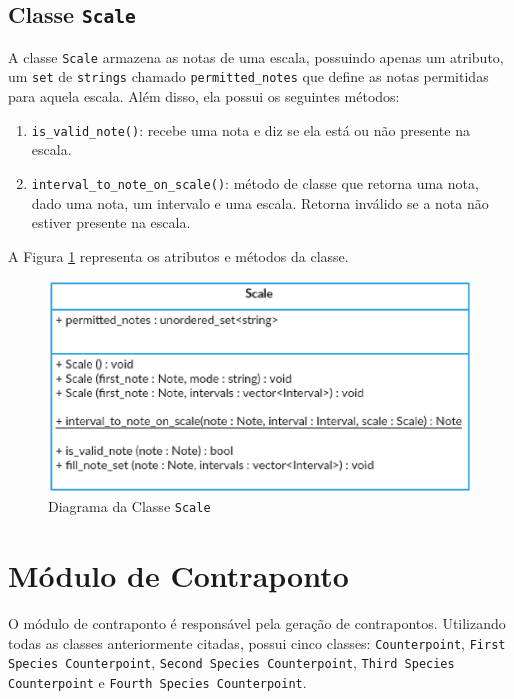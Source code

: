     \subsection[Classe \texttt{Scale}]{Classe \texttt{Scale}}

    A classe \texttt{Scale} armazena as notas de uma escala, possuindo apenas um atributo, um \texttt{set} de \texttt{strings} chamado \texttt{permitted\_notes} que define as notas permitidas para aquela escala. Além disso, ela possui os seguintes métodos:

    \begin{enumerate}
      \item \texttt{is\_valid\_note()}: recebe uma nota e diz se ela está ou não presente na escala.
      \item \texttt{interval\_to\_note\_on\_scale()}: método de classe que retorna uma nota, dado uma nota, um intervalo e uma escala. Retorna inválido se a nota não estiver presente na escala.
    \end{enumerate}


    A Figura \ref{scaleclass} representa os atributos e métodos da classe.

    \begin{figure}[htb]
      \centering
      \includegraphics[scale=0.7]{figuras/scaleclass.eps}
      \caption{Diagrama da Classe \texttt{Scale}}
      \label{scaleclass}
    \end{figure}

  \section[Módulo de Contraponto]{Módulo de Contraponto}

    O módulo de contraponto é responsável pela geração de contrapontos. Utilizando todas as classes anteriormente citadas, possui cinco classes: \texttt{Counterpoint}, \texttt{First Species Counterpoint}, \texttt{Second Species Counterpoint}, \texttt{Third Species Counterpoint} e \texttt{Fourth Species Counterpoint}.

